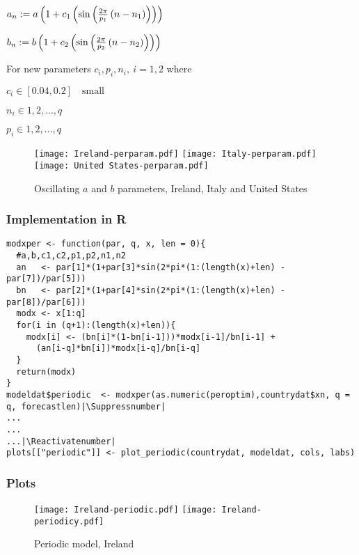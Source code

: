 $a_n := a\left(1+c_1\left(\sin\left(\frac{2\pi}{p_1}\left(n-n_1\right)\right)\right)\right)$

$b_n := b\left(1+c_2\left(\sin\left(\frac{2\pi}{p_2}\left(n-n_2\right)\right)\right)\right)$

For new parameters $c_i,p_i,n_i, \ i=1,2$ where

$c_i  \in [0.04, 0.2] \quad \text{small}$

$n_i  \in 1,2,\dots,q$

$p_i  \in 1,2,\dots,q$

\begin{figure}[H]
  \texttt{[image: Ireland-perparam.pdf]} \label{fig:ireland-perparam}
\endminipage\hfill
{}
  \texttt{[image: Italy-perparam.pdf]} \label{fig:italy-perparam}
\endminipage\hfill
{}
  \texttt{[image: United States-perparam.pdf]} \label{fig:usa-perparam}
\endminipage\hfill
\caption{Oscillating $a$ and $b$ parameters, Ireland, Italy and United States}
\end{figure}

\subsubsection{Implementation in R}

\begin{lstlisting}[breaklines = true, escapeinside=||, tabsize = 4, frame=single, caption = {Algorithm for Periodic Model}]
modxper <- function(par, q, x, len = 0){
  #a,b,c1,c2,p1,p2,n1,n2
  an   <- par[1]*(1+par[3]*sin(2*pi*(1:(length(x)+len) - par[7])/par[5]))
  bn   <- par[2]*(1+par[4]*sin(2*pi*(1:(length(x)+len) - par[8])/par[6]))
  modx <- x[1:q]
  for(i in (q+1):(length(x)+len)){
    modx[i] <- (bn[i]*(1-bn[i-1]))*modx[i-1]/bn[i-1] +
      (an[i-q]*bn[i])*modx[i-q]/bn[i-q]
  }
  return(modx)
}
modeldat$periodic  <- modxper(as.numeric(peroptim),countrydat$xn, q = q, forecastlen)|\Suppressnumber|
...
...
...|\Reactivatenumber|
plots[["periodic"]] <- plot_periodic(countrydat, modeldat, cols, labs)
\end{lstlisting}

\subsubsection{Plots}

\begin{figure}[H]
  \texttt{[image: Ireland-periodic.pdf]} \label{fig:ireland-periodic}
\endminipage\hfill
{}
  \texttt{[image: Ireland-periodicy.pdf]} \label{fig:ireland-periodicy}
\endminipage
\caption{Periodic model, Ireland}
\end{figure}

